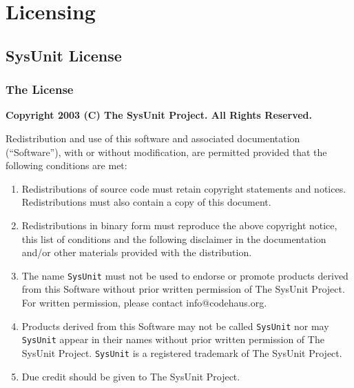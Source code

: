 \chapter{Licensing}


\renewcommand{\labelenumi}{\theenumi.}

\section{SysUnit License}

\subsection{The License}

\footnotesize

{\center \textbf{\textsf{Copyright 2003 (C) The SysUnit Project. All Rights Reserved.}}\\}

\bigskip

Redistribution and use of this software and associated documentation
(``Software''), with or without modification, are permitted provided
that the following conditions are met:

\begin{enumerate}
	\item Redistributions of source code must retain copyright
   statements and notices.  Redistributions must also contain a
   copy of this document.
 
	\item Redistributions in binary form must reproduce the
   above copyright notice, this list of conditions and the
   following disclaimer in the documentation and/or other
   materials provided with the distribution.
 
	\item The name \texttt{SysUnit} must not be used to endorse or promote
   products derived from this Software without prior written
   permission of The SysUnit Project.  For written permission,
   please contact info@codehaus.org.
 
	\item Products derived from this Software may not be called
    \texttt{SysUnit}
   nor may \texttt{SysUnit} appear in their names without prior written
   permission of The SysUnit Project. \texttt{SysUnit} is a registered
   trademark of The SysUnit Project.
 
	\item Due credit should be given to The SysUnit Project. 
\end{enumerate}
 
